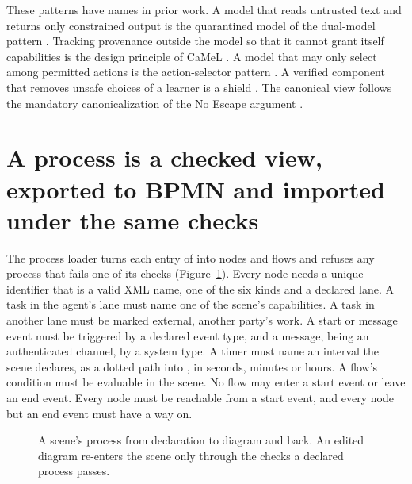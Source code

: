 These patterns have names in prior work. A model that reads untrusted text and returns only
constrained output is the quarantined model of the dual-model pattern \cite{willison2023dualllm}.
Tracking provenance outside the model so that it cannot grant itself capabilities is the design
principle of CaMeL \cite{debenedetti2026camel}. A model that may only select among permitted actions
is the action-selector pattern \cite{beurerkellner2025patterns}. A verified component that removes
unsafe choices of a learner is a shield \cite{bloem2015shield,alshiekh2018shielding}. The canonical
view follows the mandatory canonicalization of the No Escape argument \cite{bond2026noescape}.

\section{A process is a checked view, exported to BPMN and imported under the same checks}\label{sec:runtime-processes}

The process loader turns each entry of  into nodes and flows and refuses any
process that fails one of its checks (Figure~\ref{fig:runtime-process}). Every node needs a unique
identifier that is a valid XML name, one of the six kinds and a declared lane. A task in the agent's
lane must name one of the scene's capabilities. A task in another lane must be marked external,
another party's work. A start or message event must be triggered by a declared event type, and a
message, being an authenticated channel, by a system type. A timer must name an interval the scene
declares, as a dotted path into , in seconds, minutes or hours. A flow's condition must be
evaluable in the scene. No flow may enter a start event or leave an end event. Every node must be
reachable from a start event, and every node but an end event must have a way on.

\begin{figure}[t]
\centering

\caption{A scene's process from declaration to diagram and back. An edited diagram re-enters the
scene only through the checks a declared process passes.}
\label{fig:runtime-process}
\end{figure}

